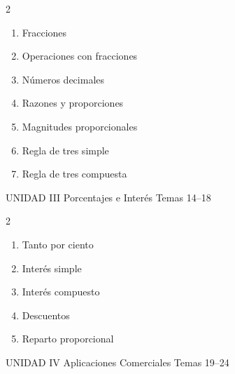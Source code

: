 \begin{multicols}{2}
  \begin{enumerate}[label=\textcolor{AzulMedio}{\textbf{\arabic*.}},
      leftmargin=2em, itemsep=1pt, start=7]
    \item Fracciones
    \item Operaciones con fracciones
    \item Números decimales
    \item Razones y proporciones
    \item Magnitudes proporcionales
    \item Regla de tres simple
    \item Regla de tres compuesta
  \end{enumerate}
\end{multicols}

\vspace{0.4cm}

\begin{tcolorbox}[enhanced, colback=AzulPizarra, colframe=DoradoAcadémico,
    arc=3pt, boxrule=1pt, left=8pt, right=8pt, top=5pt, bottom=5pt,
    fontupper=\sffamily\bfseries\color{white}]
  UNIDAD III \hfill Porcentajes e Interés \hfill Temas 14–18
\end{tcolorbox}

\begin{multicols}{2}
  \begin{enumerate}[label=\textcolor{AzulPizarra}{\textbf{\arabic*.}},
      leftmargin=2em, itemsep=1pt, start=14]
    \item Tanto por ciento
    \item Interés simple
    \item Interés compuesto
    \item Descuentos
    \item Reparto proporcional
  \end{enumerate}
\end{multicols}

\vspace{0.4cm}

\begin{tcolorbox}[enhanced, colback=AzulMedio, colframe=DoradoAcadémico,
    arc=3pt, boxrule=1pt, left=8pt, right=8pt, top=5pt, bottom=5pt,
    fontupper=\sffamily\bfseries\color{white}]
  UNIDAD IV \hfill Aplicaciones Comerciales \hfill Temas 19–24
\end{tcolorbox}

